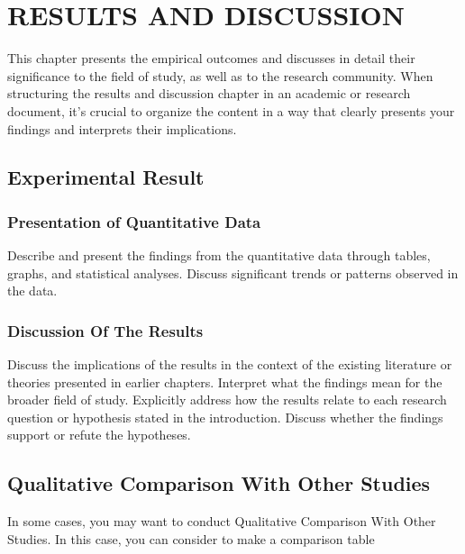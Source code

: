\chapter{ RESULTS AND DISCUSSION}

This chapter presents the empirical outcomes and discusses in detail their significance to the field of study, as well as to the research community. When structuring the results and discussion chapter in an academic or research document, it's crucial to organize the content in a way that clearly presents your findings and interprets their implications. 


\section{Experimental Result}



\subsection{Presentation of Quantitative Data}
Describe and present the findings from the quantitative data through tables, graphs, and statistical analyses. Discuss significant trends or patterns observed in the data.




\subsection{Discussion Of The Results}

Discuss the implications of the results in the context of the existing literature or theories presented in earlier chapters. Interpret what the findings mean for the broader field of study.
Explicitly address how the results relate to each research question or hypothesis stated in the introduction. Discuss whether the findings support or refute the hypotheses.




\section{Qualitative Comparison With Other Studies}

In some cases, you may want to conduct Qualitative Comparison With Other Studies. In this case, you can consider to make a comparison table

